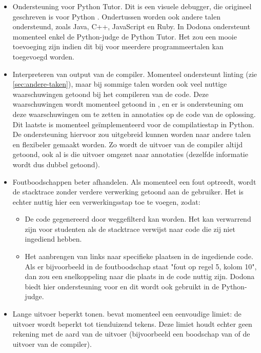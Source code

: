 \begin{itemize}
    \item Ondersteuning voor Python Tutor.
    Dit is een visuele debugger, die origineel geschreven is voor Python \autocite{10.1145/2445196.2445368}.
    Ondertussen worden ook andere talen ondersteund, zoals Java, C++, JavaScript en Ruby.
    In Dodona ondersteunt momenteel enkel de Python-judge de Python Tutor.
    Het zou een mooie toevoeging zijn indien dit bij \tested{} voor meerdere programmeertalen kan toegevoegd worden.
    \item Interpreteren van output van de compiler.
    Momenteel ondersteunt \tested{} linting (zie \cref{sec:andere-taken}), maar bij sommige talen worden ook veel nuttige waarschuwingen getoond bij het compileren van de code.
    Deze waarschuwingen wordt momenteel getoond in \tested{}, en er is ondersteuning om deze waarschuwingen om te zetten in annotaties op de code van de oplossing.
    Dit laatste is momenteel geïmplementeerd voor de compilatiestap in Python.
    De ondersteuning hiervoor zou uitgebreid kunnen worden naar andere talen en flexibeler gemaakt worden.
    Zo wordt de uitvoer van de compiler altijd getoond, ook al is die uitvoer omgezet naar annotaties (dezelfde informatie wordt dus dubbel getoond).
    \item Foutboodschappen beter afhandelen.
    Als momenteel een fout optreedt, wordt de stacktrace zonder verdere verwerking getoond aan de gebruiker.
    Het is echter nuttig hier een verwerkingsstap toe te voegen, zodat:
    \begin{itemize}
        \item De code gegenereerd door \tested{} weggefilterd kan worden.
        Het kan verwarrend zijn voor studenten als de stacktrace verwijst naar code die zij niet ingediend hebben.
        \item Het aanbrengen van links naar specifieke plaatsen in de ingediende code.
        Als er bijvoorbeeld in de foutboodschap staat "fout op regel 5, kolom 10", dan zou een snelkoppeling naar die plaats in de code nuttig zijn.
        Dodona biedt hier ondersteuning voor en dit wordt ook gebruikt in de Python-judge.
    \end{itemize}
    \item Lange uitvoer beperkt tonen.
    \tested{} bevat momenteel een eenvoudige limiet: de uitvoer wordt beperkt tot tienduizend tekens.
    Deze limiet houdt echter geen rekening met de aard van de uitvoer (bijvoorbeeld een boodschap van \tested{} of de uitvoer van de compiler).

\end{itemize}
